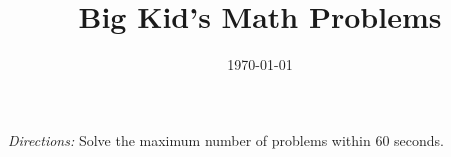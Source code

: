 \documentclass[12pt]{article} %
\title{\vspace{-2.5cm}Big Kid's Math Problems}
\date{\vspace{-2.5cm}\today}
\begin{document}
\maketitle{\vspace{-0.5cm}}

\textit{Directions:} Solve the maximum number of problems within 60 seconds.\vspace{-1.2cm}


\end{document}
